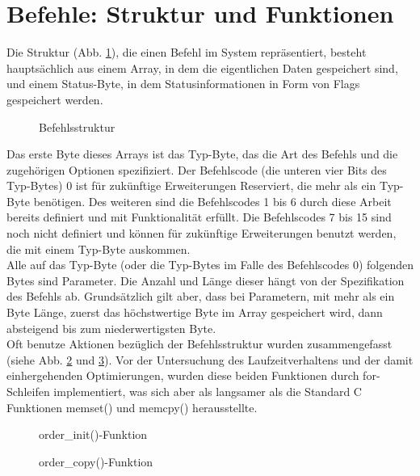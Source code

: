\section{Befehle: Struktur und Funktionen}
Die Struktur (Abb. \ref{order_type}), die einen Befehl im System repräsentiert, besteht hauptsächlich aus einem Array, in dem die eigentlichen Daten
gespeichert sind, und einem Status-Byte, in dem Statusinformationen in Form von Flags gespeichert werden.
\begin{figure}[htb]
 \centering
 \caption{\label{order_type}Befehlsstruktur}
\end{figure}
Das erste Byte dieses Arrays ist das Typ-Byte, das die Art des Befehls und die zugehörigen Optionen spezifiziert. Der
Befehlscode (die unteren vier Bits des Typ-Bytes) 0 ist für zukünftige Erweiterungen Reserviert, die mehr als ein Typ-Byte
benötigen. Des weiteren sind die Befehlscodes 1 bis 6 durch diese Arbeit bereits definiert und mit Funktionalität erfüllt.
Die Befehlscodes 7 bis 15 sind noch nicht definiert und können für zukünftige Erweiterungen benutzt werden, die mit einem
Typ-Byte auskommen.\\
Alle auf das Typ-Byte (oder die Typ-Bytes im Falle des Befehlscodes 0) folgenden Bytes sind Parameter. Die Anzahl und Länge
dieser hängt von der Spezifikation des Befehls ab. Grundsätzlich gilt aber, dass bei Parametern, mit mehr als ein Byte Länge,
zuerst das höchstwertige Byte im Array gespeichert wird, dann absteigend bis zum niederwertigsten Byte.\\
Oft benutze Aktionen bezüglich der Befehlsstruktur wurden zusammengefasst (siehe Abb. \ref{order_init} und \ref{order_copy}).
Vor der Untersuchung des Laufzeitverhaltens und der damit einhergehenden Optimierungen, wurden diese beiden Funktionen
durch for-Schleifen implementiert, was sich aber als langsamer als die Standard C Funktionen memset() und memcpy()
herausstellte.
\begin{figure}[htb]
 \centering
 \caption{\label{order_init}order\_init()-Funktion}
\end{figure}
\begin{figure}[htb]
 \centering
 \caption{\label{order_copy}order\_copy()-Funktion}
\end{figure}
